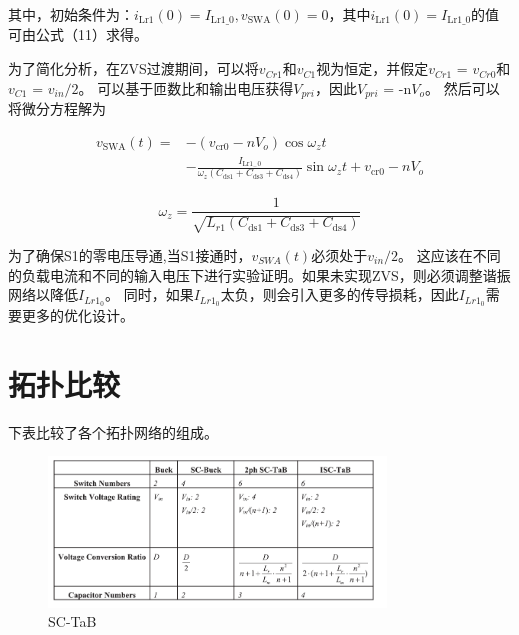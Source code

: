 \documentclass[12pt,a4paper]{report}
\begin{document}
其中，初始条件为：$i_{\mathrm{Lr} 1}(0)=I_{\mathrm{Lr} 1\_0}, v_{\mathrm{SWA}}(0)=0$，其中$i_{\mathrm{Lr} 1}(0)=I_{\mathrm{Lr} 1\_0}$的值可由公式（11）求得。

为了简化分析，在ZVS过渡期间，可以将$v_{Cr1}$和$v_{C1}$视为恒定，并假定$v_{Cr1}$ = $v_{Cr0}$和$v_{C1}$ = $v_{in}/2$。 可以基于匝数比和输出电压获得$V_{pri}$，因此$V_{pri}$ = -n$V_{o}$。 然后可以将微分方程解为


\begin{equation}
    \begin{aligned}
        v_{\mathrm{SWA}}(t)= & -\left(v_{\mathrm{cr} 0}-n V_{o}\right) \cos \omega_{z} t                                                                                                 \\
                             & -\frac{I_{\mathrm{Lr} 1_{-} 0}}{\omega_{z}\left(C_{\mathrm{ds} 1}+C_{\mathrm{ds} 3}+C_{\mathrm{ds} 4}\right)} \sin \omega_{z} t+v_{\mathrm{cr} 0}-n V_{o}
    \end{aligned}
\end{equation}

\begin{equation}
    \omega_{z}=\frac{1}{\sqrt{L_{r 1}\left(C_{\mathrm{ds} 1}+C_{\mathrm{ds} 3}+C_{\mathrm{ds} 4}\right)}}
\end{equation}

为了确保S1的零电压导通,当S1接通时，$v_{SWA}(t)$必须处于$v_{in}/2$。
这应该在不同的负载电流和不同的输入电压下进行实验证明。如果未实现ZVS，则必须调整谐振网络以降低$I_{Lr1_0}$。 同时，如果$I_{Lr1_0}$太负，则会引入更多的传导损耗，因此$I_{Lr1_0}$需要更多的优化设计。

\section{拓扑比较}
下表比较了各个拓扑网络的组成。

\begin{figure}[h]
    \centering
    \includegraphics[width = 0.8\textwidth]{figures/table_summary.png}
    \caption{SC-TaB}
\end{figure}
\end{document}

